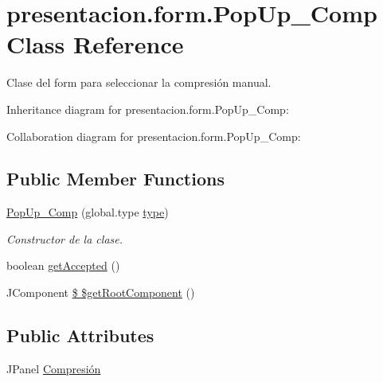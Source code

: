 \hypertarget{classpresentacion_1_1form_1_1PopUp__Comp}{}\section{presentacion.\+form.\+Pop\+Up\+\_\+\+Comp Class Reference}
\label{classpresentacion_1_1form_1_1PopUp__Comp}


Clase del form para seleccionar la compresión manual.  




Inheritance diagram for presentacion.\+form.\+Pop\+Up\+\_\+\+Comp\+:


Collaboration diagram for presentacion.\+form.\+Pop\+Up\+\_\+\+Comp\+:
\subsection*{Public Member Functions}
\begin{DoxyCompactItemize}
\item 
\hyperlink{classpresentacion_1_1form_1_1PopUp__Comp_afe8952b1a34b6ed17ad1698000ceba81}{Pop\+Up\+\_\+\+Comp} (global.\+type \hyperlink{classpresentacion_1_1form_1_1PopUp__Comp_af1981117e5555e0308d7e4a0f61db50b}{type})
\begin{DoxyCompactList}\small\item\em Constructor de la clase. \end{DoxyCompactList}\item 
boolean \hyperlink{classpresentacion_1_1form_1_1PopUp__Comp_af8adf2ad4849ea03ea61c5d681bb0a28}{get\+Accepted} ()
\item 
J\+Component \hyperlink{classpresentacion_1_1form_1_1PopUp__Comp_a8f22f1163ae09f7b29cf322670530af9}{\$ \$get\+Root\+Component} ()
\end{DoxyCompactItemize}
\subsection*{Public Attributes}
\begin{DoxyCompactItemize}
\item 
J\+Panel \hyperlink{classpresentacion_1_1form_1_1PopUp__Comp_a5769b499f21466bae765c41428512966}{Compresión}
\end{DoxyCompactItemize}
